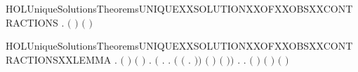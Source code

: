 \begin{SaveVerbatim}{HOLUniqueSolutionsTheoremsUNIQUEXXSOLUTIONXXOFXXOBSXXCONTRACTIONS}
\HOLTokenTurnstile{} \HOLSymConst{\HOLTokenForall{}}  .
         \HOLSymConst{\HOLTokenConj{}}   \ensuremath{(} \ensuremath{)} \HOLSymConst{\HOLTokenConj{}}   \ensuremath{(} \ensuremath{)} \HOLSymConst{\HOLTokenImp{}}
         
\end{SaveVerbatim}
\newcommand{\HOLUniqueSolutionsTheoremsUNIQUEXXSOLUTIONXXOFXXOBSXXCONTRACTIONS}{\UseVerbatim{HOLUniqueSolutionsTheoremsUNIQUEXXSOLUTIONXXOFXXOBSXXCONTRACTIONS}}
\begin{SaveVerbatim}{HOLUniqueSolutionsTheoremsUNIQUEXXSOLUTIONXXOFXXOBSXXCONTRACTIONSXXLEMMA}
\HOLTokenTurnstile{} \HOLSymConst{\HOLTokenForall{}}  .
         \HOLSymConst{\HOLTokenConj{}}   \ensuremath{(} \ensuremath{)} \HOLSymConst{\HOLTokenConj{}}   \ensuremath{(} \ensuremath{)} \HOLSymConst{\HOLTokenImp{}}
       \HOLSymConst{\HOLTokenForall{}}.
             \HOLSymConst{\HOLTokenImp{}}
           \ensuremath{(}\HOLSymConst{\HOLTokenForall{}} .
                  \HOLTokenWeakTransBegin{} \HOLTokenWeakTransEnd {} \HOLSymConst{\HOLTokenImp{}}
                \HOLSymConst{\HOLTokenExists{}}.
                      \HOLSymConst{\HOLTokenConj{}}     \HOLSymConst{\HOLTokenConj{}}
                    \ensuremath{(}  \ensuremath{(}\HOLTokenLambda{} .  \HOLTokenWeakTransBegin{} \HOLTokenWeakTransEnd {}\ensuremath{)}\ensuremath{)} \ensuremath{(} \ensuremath{)}
                      \ensuremath{(} \ensuremath{)}\ensuremath{)} \HOLSymConst{\HOLTokenConj{}}
           \HOLSymConst{\HOLTokenForall{}}.
                 \HOLTokenWeakTransBegin\HOLConst{\ensuremath{\tau}}\HOLTokenWeakTransEnd {} \HOLSymConst{\HOLTokenImp{}}
               \HOLSymConst{\HOLTokenExists{}}.
                     \HOLSymConst{\HOLTokenConj{}}     \HOLSymConst{\HOLTokenConj{}}
                   \ensuremath{(}  \ensuremath{)} \ensuremath{(} \ensuremath{)} \ensuremath{(} \ensuremath{)}
\end{SaveVerbatim}
